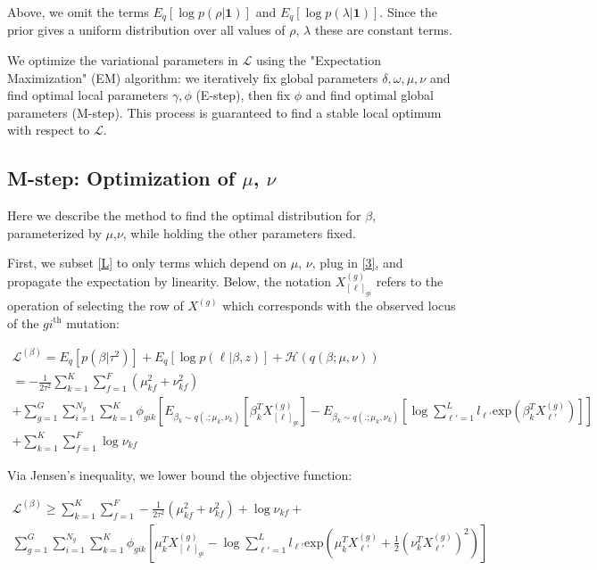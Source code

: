 \documentclass{article}
\newcommand{\Lagr}{\mathcal{L}}
\begin{document}
Above, we omit the terms $E_q[\log p(\rho| \textbf{1})]$ and $E_q[\log p(\lambda| \textbf{1})]$. Since the prior gives a uniform distribution over all values of $\rho$, $\lambda$ these are constant terms.

We optimize the variational parameters in $\Lagr$ using the "Expectation Maximization" (EM) algorithm: we iteratively fix global parameters $\delta, \omega, \mu, \nu$ and find optimal local parameters $\gamma, \phi$ (E-step), then fix $\phi$ and find optimal global parameters (M-step). This process is guaranteed to find a stable local optimum with respect to $\Lagr$.


\subsection{M-step: Optimization of $\mu$, $\nu$}

Here we describe the method to find the optimal distribution for $\beta$, parameterized by $\mu$,$\nu$, while holding the other parameters fixed.

First, we subset \eqref{L} to only terms which depend on $\mu$, $\nu$, plug in \eqref{3}, and propagate the expectation by linearity. Below, the notation $X^{(g)}_{[\ell]_{gi}}$ refers to the operation of selecting the row of $X^{(g)}$ which corresponds with the observed locus of the $gi^\mathrm{th}$ mutation:

\begin{equation}
\begin{split}
\Lagr^{(\beta)} = E_q[p(\beta | \tau^2)] + E_q[\log p(\ell | \beta, z)] + \mathcal{H}(q(\beta;\mu, \nu)) \\
	= -\frac{1}{2\tau^2}\sum_{k=1}^K \sum_{f=1}^F \left( \mu_{kf}^2 + \nu_{kf}^2 \right) \\
	+ \sum_{g=1}^G \sum_{i=1}^{N_g} \sum_{k=1}^K  \phi_{gik} \left[ E_{\beta_k \sim q(.;\mu_k,\nu_k)} [\beta_k^T X^{(g)}_{[\ell]_{gi}}] - E_{\beta_k \sim q(.;\mu_k,\nu_k)} [\log{\sum_{\ell'=1}^L l_{\ell'} \textrm{exp}( \beta_k^T X^{(g)}_{\ell'} )}] \right] \\
	+ \sum_{k=1}^K \sum_{f=1}^F \log \nu_{kf}
\end{split}
\end{equation}

Via Jensen's inequality, we lower bound the objective function:

\begin{equation}
\begin{split}
\Lagr^{(\beta)} \geq \sum_{k=1}^K \sum_{f=1}^F -\frac{1}{2\tau^2}\left(\mu_{kf}^2 + \nu_{kf}^2 \right) + \log \nu_{kf} + \\
	\sum_{g=1}^G \sum_{i=1}^{N_g} \sum_{k=1}^K  \phi_{gik} \left[ \mu_k^T X^{(g)}_{[\ell]_{gi}} - \log{\sum_{\ell'=1}^L l_{\ell'} \textrm{exp}\left( \mu_k^T X^{(g)}_{\ell'} + \frac{1}{2}(\nu_k^T X^{(g)}_{\ell'})^2\right) } \right]
\end{split}
\end{equation}
\end{document}
